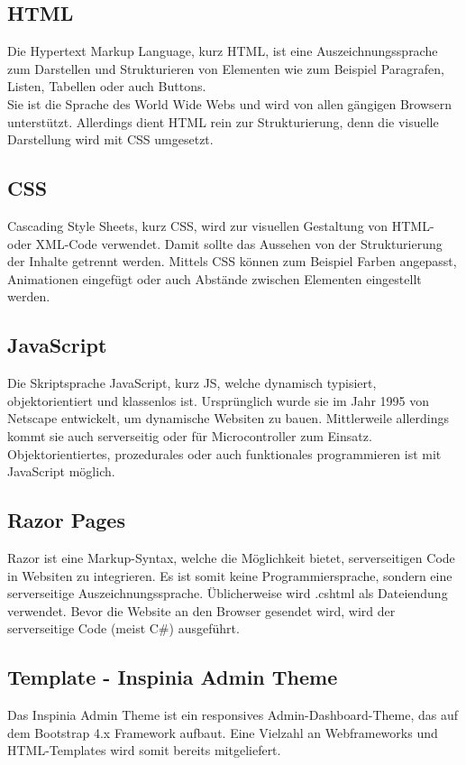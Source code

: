     \subsection{HTML}
    Die Hypertext Markup Language, kurz HTML, ist eine Auszeichnungssprache zum Darstellen und 
    Strukturieren von Elementen wie zum Beispiel Paragrafen, Listen, Tabellen oder auch Buttons.
    \\
    Sie ist die Sprache des World Wide Webs und wird von allen gängigen Browsern unterstützt.
    Allerdings dient HTML rein zur Strukturierung, denn die visuelle Darstellung wird mit CSS umgesetzt.

    \subsection{CSS}
    Cascading Style Sheets, kurz CSS, wird zur visuellen Gestaltung von HTML- oder XML-Code verwendet. 
    Damit sollte das Aussehen von der Strukturierung der Inhalte getrennt werden. Mittels CSS können
    zum Beispiel Farben angepasst, Animationen eingefügt oder auch Abstände zwischen Elementen
    eingestellt werden.

    \subsection{JavaScript}
    Die Skriptsprache JavaScript, kurz JS, welche dynamisch typisiert, objektorientiert und 
    klassenlos ist. Ursprünglich wurde sie im Jahr 1995 von Netscape entwickelt, um dynamische
    Websiten zu bauen. Mittlerweile allerdings kommt sie auch serverseitig oder für Microcontroller
    zum Einsatz. Objektorientiertes, prozedurales oder auch funktionales programmieren ist mit JavaScript
    möglich.

    \subsection{Razor Pages}
    Razor ist eine Markup-Syntax, welche die Möglichkeit bietet, serverseitigen Code in Websiten
    zu integrieren. Es ist somit keine Programmiersprache, sondern eine serverseitige Auszeichnungssprache.
    Üblicherweise wird .cshtml als Dateiendung verwendet. Bevor die Website an den Browser gesendet wird,
    wird der serverseitige Code (meist C\#) ausgeführt.

    \subsection{Template - Inspinia Admin Theme}
    Das Inspinia Admin Theme ist ein responsives Admin-Dashboard-Theme, das auf dem Bootstrap 4.x
    Framework aufbaut. Eine Vielzahl an Webframeworks und HTML-Templates wird somit bereits mitgeliefert.

